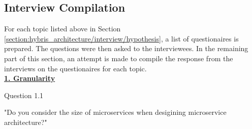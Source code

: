 \subsection{Interview Compilation}\label{section:hybris_architecture/interview/interview_compilation}
For each topic listed above in Section \ref{section:hybris_architecture/interview/hypothesis}, a list of questionaires is prepared. The questions were then asked to the interviewees. In the remaining part of this section, an attempt is made to compile the response from the interviews on the questionaires for each topic.
\\
\textbf{\underline{1. Granularity}}\\  
\begin{shaded} Question 1.1 \end{shaded} \label{question:hybris_architecture/interview/question_1.1}
"Do you consider the size of microservices when desigining microservice architecture?"\\

\\
\\

